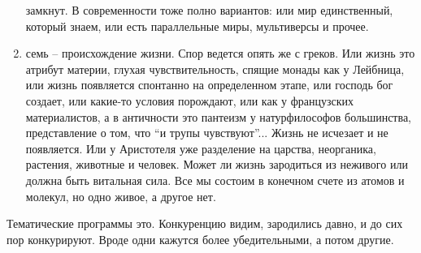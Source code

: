 \documentclass[a4paper, 12pt]{article}
\begin{document}
\begin{enumerate}
    замкнут. В современности тоже полно вариантов: или мир единственный, 
    который знаем, или есть параллельные миры, мультиверсы и прочее.
  \item семь -- происхождение жизни. Спор ведется опять же с греков. Или 
    жизнь это атрибут материи, глухая чувствительность, спящие монады 
    как у Лейбница, или жизнь появляется спонтанно на определенном 
    этапе, или господь бог создает, или какие-то условия порождают, или 
    как у французских материалистов, а в античности это пантеизм 
    у натурфилософов большинства, представление о том, что ``и трупы 
    чувствуют''... Жизнь не исчезает и не появляется. Или у Аристотеля 
    уже разделение на царства, неорганика, растения, животные и человек. 
    Может ли жизнь зародиться из неживого или должна быть витальная 
    сила. Все мы состоим в конечном счете из атомов и молекул, но одно 
    живое, а другое нет.
\end{enumerate}
Тематические программы это. Конкуренцию видим, зародились давно, и до 
сих пор конкурируют. Вроде одни кажутся более убедительными, а потом 
другие.
\end{document}
